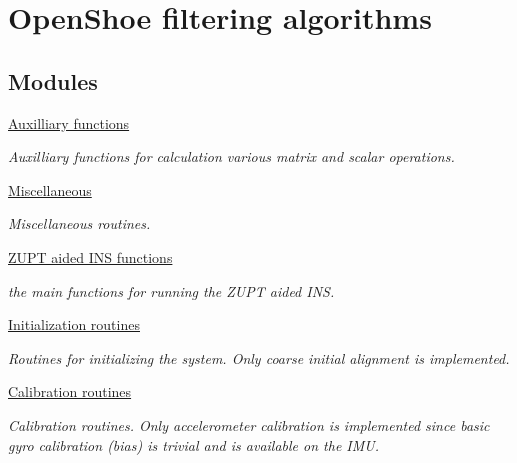 \hypertarget{group__nav__eq}{
\section{\-Open\-Shoe filtering algorithms}
\label{group__nav__eq}
}
\subsection*{\-Modules}
\begin{DoxyCompactItemize}
\item 
\hyperlink{group__aux__func}{\-Auxilliary functions}
\begin{DoxyCompactList}\small\item\em \-Auxilliary functions for calculation various matrix and scalar operations. \end{DoxyCompactList}\item 
\hyperlink{group__miscel}{\-Miscellaneous}
\begin{DoxyCompactList}\small\item\em \-Miscellaneous routines. \end{DoxyCompactList}\item 
\hyperlink{group__main__func}{\-Z\-U\-P\-T aided I\-N\-S functions}
\begin{DoxyCompactList}\small\item\em the main functions for running the \-Z\-U\-P\-T aided \-I\-N\-S. \end{DoxyCompactList}\item 
\hyperlink{group__init}{\-Initialization routines}
\begin{DoxyCompactList}\small\item\em \-Routines for initializing the system. \-Only coarse initial alignment is implemented. \end{DoxyCompactList}\item 
\hyperlink{group__calib}{\-Calibration routines}
\begin{DoxyCompactList}\small\item\em \-Calibration routines. \-Only accelerometer calibration is implemented since basic gyro calibration (bias) is trivial and is available on the \-I\-M\-U. \end{DoxyCompactList}\end{DoxyCompactItemize}
